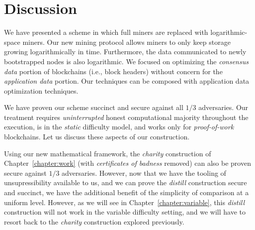 \section{Discussion}

We have presented a scheme in which full miners are replaced with log\-a\-rith\-mic-space
miners. Our new mining protocol allows miners to only keep storage growing logarithmically
in time. Furthermore, the data communicated to newly bootstrapped nodes is also logarithmic.
We focused on optimizing the \emph{consensus data} portion of blockchains (i.e., block
headers) without concern for the \emph{application data} portion. Our techniques can
be composed with application data optimization techniques.

We have proven our scheme succinct and secure against all $1/3$ adversaries.
Our treatment requires \emph{uninterrupted} honest computational majority
throughout the execution, is in the \emph{static} difficulty model, and works
only for \emph{proof-of-work} blockchains. Let us discuss these
aspects of our construction.

Using our new mathematical framework, the \emph{charity} construction of
Chapter~\ref{chapter:work} (with \emph{certificates of badness} removed) can also be
proven secure against $1/3$ adversaries. However, now that we have the tooling of unsupressibility
available to us, and we can prove the \emph{distill} construction secure and succinct,
we have the additional benefit of the simplicity of comparison at a uniform level.
However, as we will see in Chapter~\ref{chapter:variable}, this \emph{distill} construction
will not work in the variable difficulty setting, and we will have to resort back to the
\emph{charity} construction explored previously.

